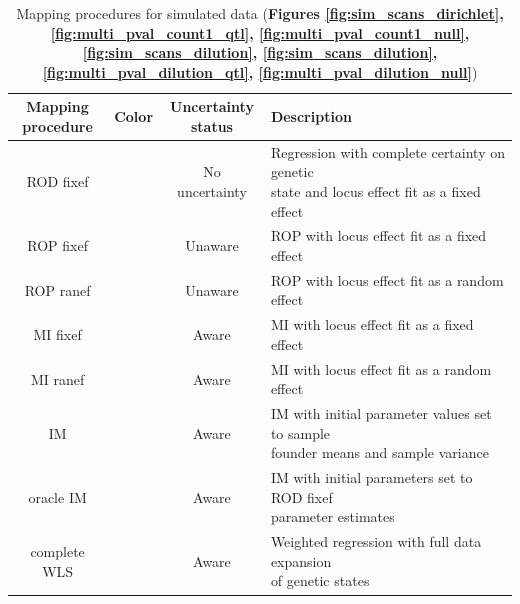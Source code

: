 \begin{table}
\renewcommand{\familydefault}{\sfdefault}\normalfont
\begin{minipage}{\textwidth}
\centering
\caption[Mapping procedures for simulated data]{Mapping procedures for simulated data (\textbf{Figures \ref{fig:sim_scans_dirichlet}, \ref{fig:multi_pval_count1_qtl}, \ref{fig:multi_pval_count1_null}, \ref{fig:sim_scans_dilution}, \ref{fig:sim_scans_dilution}, \ref{fig:multi_pval_dilution_qtl}, \ref{fig:multi_pval_dilution_null}})
\label{tab:mapping_procedures}}
\end{minipage}

\begin{minipage}{\textwidth}
\begin{tabularx}{\textwidth}{c|c|c|l}
\hline
\makecell{\textbf{Mapping} \\ \textbf{procedure}} 
& \makecell{\textbf{Color} \\ \;} 
& \makecell{\textbf{Uncertainty} \\ \textbf{status}} & \makecell{\textbf{Description} \\ \;} \\
\hline
\makecell{ROD fixef \\ \;} & \cellcolor[HTML]{000000} & \makecell{No uncertainty \\ \;} & \makecell[l]{Regression with complete certainty on genetic \\ \qquad state and locus effect fit as a fixed effect} \\
\hline
ROP fixef & \cellcolor[HTML]{0000FF} & Unaware & ROP with locus effect fit as a fixed effect \\
ROP ranef & \cellcolor[HTML]{87CEEB} & Unaware & ROP with locus effect fit as a random effect \\
\hline
MI fixef & \cellcolor[HTML]{8B0000} & Aware & MI with locus effect fit as a fixed effect \\
MI ranef & \cellcolor[HTML]{FF0080} & Aware & MI with locus effect fit as a random effect \\
\makecell{IM \\ \;} & \cellcolor[HTML]{006400} & \makecell{Aware \\ \;} & \makecell[l]{IM with initial parameter values set to sample \\ \qquad founder means and sample variance} \\
\makecell{oracle IM \\ \;} & \cellcolor[HTML]{00FF00} & \makecell{Aware \\ \;} & \makecell[l]{IM with initial parameters set to ROD fixef \\ \qquad parameter estimates} \\
\makecell{complete WLS \\ \;} & \cellcolor[HTML]{FFA500} & \makecell{Aware \\ \;} & \makecell[l]{Weighted regression with full data expansion \\ \qquad of genetic states} \\
\hline
\end{tabularx}
\end{minipage}
\end{table}


